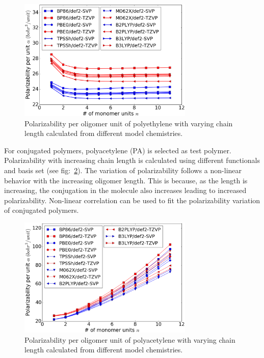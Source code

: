 \begin{figure}[htbp] 
	\centering
	\includegraphics[width=0.744\textwidth]{Chapter-3/Figures/PE_per.eps}
	\caption{Polarizability per oligomer unit of polyethylene with varying chain length calculated from different model chemistries.} 
	\label{fig:PE_per} 
\end{figure}  

For conjugated polymers, polyacetylene (PA) is selected as test polymer. Polarizability with increasing chain length is calculated using different functionals and basis set (see fig:\ \ref{fig:PA_per}). The variation of polarizability follows a non-linear behavior with the increasing oligomer length. This is because, as the length is increasing, the conjugation in the molecule also increases leading to increased polarizability. Non-linear correlation can be used to fit the polarizability variation of conjugated polymers. 

\begin{figure}[htbp] 
	\centering
	\includegraphics[width=0.744\textwidth]{Chapter-3/Figures/PA_per.eps}
	\caption{Polarizability per oligomer unit of polyacetylene with varying chain length calculated from different model chemistries.} 
	\label{fig:PA_per} 
\end{figure}  

